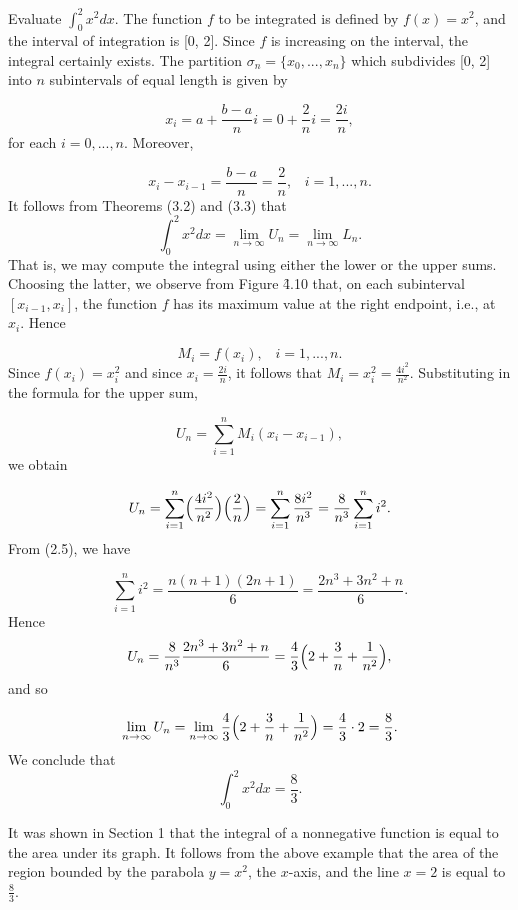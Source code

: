 \begin{example}
Evaluate $\int_{0}^{2} x^2 dx$. The function $f$ to be integrated is defined by $f(x) = x^2$, and the interval of integration is [0, 2]. Since $f$ is increasing on the interval, the integral certainly exists. The partition $\sigma_n = \{x_0, ..., x_n \}$ which subdivides [0, 2] into $n$ subintervals of equal length is given by

$$
x_i = a+ \frac{b -a}{n} i=0+\frac{2}{n} i  = \frac{2i}{n},
$$
\noindent for each $i = 0, . . ., n$. Moreover,  

$$
x_{i} - x_{i - 1} = \frac{b-a}{n} = \frac{2}{n}, \;\;\; i = 1, . . ., n.
$$
\noindent It follows from Theorems (3.2) and (3.3) that  
$$
\int_{0}^2 x^2 dx = \lim_{n \rightarrow \infty} U_n = \lim_{n \rightarrow \infty} L_n.
$$
\noindent That is, we may compute the integral using either the lower or the upper sums. Choosing the latter, we observe from Figure \f{4.10} that, on each subinterval $[x_{i - 1}, x_i]$, the function $f$ has its maximum value at the right endpoint, i.e., at $x_i$. Hence

$$
M_i = f(x_i),\;\;\;  i= 1,...,n.
$$
\noindent Since $f(x_i) = x_{i}^2$ and since $x_i = \frac{2i}{n}$, it follows that $M_i = x_{i}^2 = \frac{4i^2}{n^2}$. Substituting in the formula for the upper sum,  

$$
U_n = \sum_{i=1}^{n} M_i (x_i - x_{i - 1}),
$$
\noindent we obtain

$$
U_n = \sum_{i=1}^{n} \Bigl( \frac{4i^2}{n^2} \Bigr) \Bigl( \frac{2}{n} \Bigr) 
= \sum_{i=1}^{n} \frac{8i^2}{n^3} = \frac{8}{n^3} \sum_{i=1}^{n} i^2.
$$
\noindent From (2.5), we have

$$
\sum_{i=1}^{n} i^2 = \frac{n(n + 1)(2n + 1)}{6} = \frac{ 2n^3 + 3n^2 + n}{6}.
$$
\noindent Hence
$$
U_n = \frac{8}{n^3} \frac{2n^3 + 3n^2 + n}{6} = \frac{4}{3} \Bigl( 2 + \frac{3}{n} + \frac{1}{n^2} \Bigr),
$$
\noindent and so

$$
\lim_{n \rightarrow \infty} U_n = \lim_{n \rightarrow \infty} \frac{4}{3} \Bigl( 2 + \frac{3}{n} + \frac{1}{n^2} \Bigr)
=
\frac{4}{3} \cdot  2 = \frac {8}{3}.
$$
\noindent We conclude that
$$
\int_{0}^{2} x^2 dx = \frac{8}{3}.
$$
\end{example}
\medskip


It was shown in Section 1 that the integral of a nonnegative function is equal to the area under its graph. It follows from the above example that the area of the region bounded by the parabola $y = x^2$, the $x$-axis, and the line $x = 2$ is equal to $\frac{8}{3}$.

